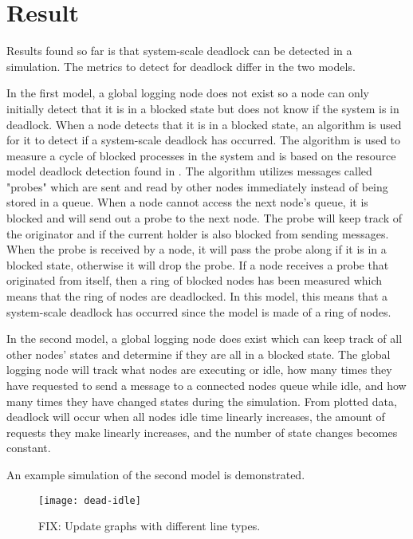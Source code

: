 \documentclass{article}
\begin{document}
\section{Result} %

Results found so far is that system-scale deadlock can be detected in a simulation. The metrics to detect for deadlock differ in the two models.

In the first model, a global logging node does not exist so a node can only initially detect that it is in a blocked state but does not know if the system is in deadlock. When a node detects that it is in a blocked state, an algorithm is used for it to detect if a system-scale deadlock has occurred. The algorithm is used to measure a cycle of blocked processes in the system and is based on the resource model deadlock detection found in \cite[p. 149]{1983_Chandy}. The algorithm utilizes messages called "probes" which are sent and read by other nodes immediately instead of being stored in a queue. When a node cannot access the next node's queue, it is blocked and will send out a probe to the next node. The probe will keep track of the originator and if the current holder is also blocked from sending messages. When the probe is received by a node, it will pass the probe along if it is in a blocked state, otherwise it will drop the probe. If a node receives a probe that originated from itself, then a ring of blocked nodes has been measured which means that the ring of nodes are deadlocked. In this model, this means that a system-scale deadlock has occurred since the model is made of a ring of nodes.

In the second model, a global logging node does exist which can keep track of all other nodes' states and determine if they are all in a blocked state. The global logging node will track what nodes are executing or idle, how many times they have requested to send a message to a connected nodes queue while idle, and how many times they have changed states during the simulation. From plotted data, deadlock will occur when all nodes idle time linearly increases, the amount of requests they make linearly increases, and the number of state changes becomes constant. 

An example simulation of the second model is demonstrated.

\begin{figure}[H]
	\texttt{[image: dead-idle]}\newline
	\centering
	\caption{\color{red} FIX: Update graphs with different line types. }
	\centering
\end{figure}
\end{document}
